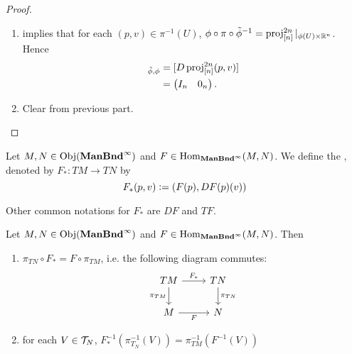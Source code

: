 \documentclass{book}
\begin{document}
\begin{proof}
	\begin{enumerate}
		\item {} \rex{} implies that for each $(p,v) \in \pi^{-1}(U)$, $\phi \circ \pi \circ \tilde{\phi}^{-1} = \operatorname{\text{proj}}^{2n}_{[n]}|_{\phi(U) \times \mathbb{R}^n}$. Hence 
		\begin{align*}
			[D \pi (p,v)]_{\tl{\phi}, \phi}
			& = [D \prj^{2n}_{[n]}(p,v)] \\
			& = 
			\begin{pmatrix}
				I_n & 0_n
			\end{pmatrix}.
		\end{align*}
		\item Clear from previous part.
	\end{enumerate}
\end{proof}

\begin{defn}
	Let $M,N \in \operatorname{Obj}(\operatorname*{\text{\textbf{ManBnd}}^{\infty}})$ and $F \in \operatorname{Hom}_{\operatorname*{\text{\textbf{ManBnd}}^{\infty}}}(M, N)$. We define the , denoted by $F_*: TM \rightarrow TN$ by 
	$$F_*(p, v) \vcentcolon= (F(p), DF(p)(v))$$
\end{defn}

\begin{note}
	Other common notations for $F_*$ are $DF$ and $TF$.
\end{note}

\begin{ex}
	Let $M,N \in \operatorname{Obj}(\operatorname*{\text{\textbf{ManBnd}}^{\infty}})$ and $F \in \operatorname{Hom}_{\operatorname*{\text{\textbf{ManBnd}}^{\infty}}}(M, N)$. Then 
	\begin{enumerate}
		\item $\pi_{TN} \circ F_* = F \circ \pi_{TM}$, i.e. the following diagram commutes: 
		\[ 
		\begin{tikzcd}
			TM \arrow[r, "F_*"] \arrow[d, "\pi_{TM}"'] & TN \arrow[d, "\pi_{TN}"]  \\
			M \arrow[r, "F"']                   & N
		\end{tikzcd}
		\]
		\item for each $V \in \mathcal{T}_N$, $F_*^{-1}(\pi_{T_N}^{-1}(V)) = \pi_{TM}^{-1}(F^{-1}(V))$
	\end{enumerate}
\end{ex}
\end{document}
